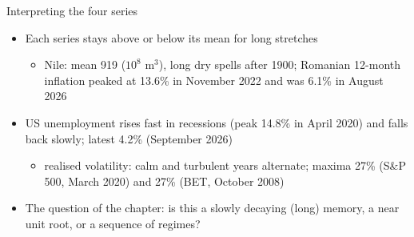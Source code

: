 \begin{frame}{Interpreting the four series}
\itemsize{\small}
\begin{itemize}
    \item Each series stays above or below its mean for long stretches
    \begin{itemize}
        \item Nile: mean 919 ($10^8$ m$^3$), long dry spells after 1900; Romanian 12-month inflation peaked at 13.6\% in November 2022 and was 6.1\% in August 2026
    \end{itemize}
    \item US unemployment rises fast in recessions (peak 14.8\% in April 2020) and falls back slowly; latest 4.2\% (September 2026)
    \begin{itemize}
        \item realised volatility: calm and turbulent years alternate; maxima 27\% (S\&P 500, March 2020) and 27\% (BET, October 2008)
    \end{itemize}
    \item The question of the chapter: is this a slowly decaying (long) memory, a near unit root, or a sequence of regimes?
\end{itemize}
\end{frame}

